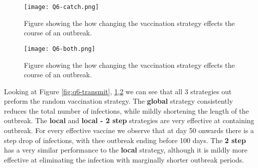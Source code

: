 \begin{figure}[h!]
    \begin{center}
        \texttt{[image: Q6-catch.png]}
        \caption{Figure showing the how changing the vaccination strategy effects the course of an outbreak.} 
        \label{fig:q6-catch}
    \end{center}
\end{figure}


\begin{figure}[h!]
    \begin{center}
        \texttt{[image: Q6-both.png]}
        \caption{Figure showing the how changing the vaccination strategy effects the course of an outbreak. } 
        \label{fig:q6-both}
    \end{center}
\end{figure}


Looking at Figure \ref{fig:q6-transmit}, \ref{fig:q6-catch},\ref{fig:q6-both} we can see that all 3 strategies out preform the random vaccination strategy.
The \textbf{global} strategy consistently reduces the total number of infections, while mildly shortening the length of the outbreak.
The \textbf{local} and \textbf{local - 2 step} strategies are very effective at containing outbreak.
For every effective vaccine we observe that at day 50 onwards there is a step drop of infections, with thee outbreak ending before 100 days.
The \textbf{2 step} has a very similar performance to the \textbf{local} strategy, although it is mildly more effective at eliminating the infection with marginally shorter outbreak periods.   
